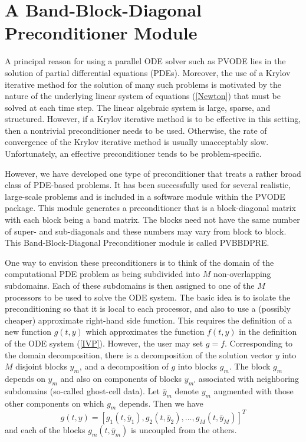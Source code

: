 \section{A Band-Block-Diagonal Preconditioner Module}

A principal reason for using a parallel ODE solver such as PVODE lies
in the solution of partial differential equations (PDEs).  Moreover,
the use of a Krylov iterative method for the solution of many such
problems is motivated by the nature of the underlying linear system of
equations (\ref{Newton}) that must be solved at each time step.  The
linear algebraic system is large, sparse, and structured. However, if
a Krylov iterative method is to be effective in this setting, then a
nontrivial preconditioner needs to be used.  Otherwise, the rate of
convergence of the Krylov iterative method is usually unacceptably
slow.  Unfortunately, an effective preconditioner tends to be
problem-specific.

However, we have developed one type of preconditioner that treats a
rather broad class of PDE-based problems.  It has been successfully
used for several realistic, large-scale problems \cite{HT} and is
included in a software module within the PVODE package. This module
generates a preconditioner that is a block-diagonal matrix with each
block being a band matrix. The blocks need not have the same number of
super- and sub-diagonals and these numbers may vary from block to
block. This Band-Block-Diagonal Preconditioner module is called
PVBBDPRE.

One way to envision these preconditioners is to think of the domain of
the computational PDE problem as being subdivided into $M$ non-overlapping
subdomains.  Each of these subdomains is then assigned to one of the
$M$ processors to be used to solve the ODE system. The basic idea is
to isolate the preconditioning so that it is local to each processor,
and also to use a (possibly cheaper) approximate right-hand side
function. This requires the definition of a new function $g(t,y)$
which approximates the function $f(t, y)$ in the definition of the ODE
system (\ref{IVP}). However, the user may set $g = f$.  Corresponding
to the domain decomposition, there is a decomposition of the solution
vector $y$ into $M$ disjoint blocks $y_m$, and a decomposition of $g$
into blocks $g_m$.  The block $g_m$ depends on $y_m$ and also on
components of blocks $y_{m'}$ associated with neighboring subdomains
(so-called ghost-cell data).  Let $\bar{y}_m$ denote $y_m$ augmented
with those other components on which $g_m$ depends.  Then we have
\begin{equation}
g(t,y) = [g_1(t,\bar{y}_1), g_2(t,\bar{y}_2), \ldots, g_M(t,\bar{y}_M)]^T
\end{equation}
and each of the blocks $g_m(t, \bar{y}_m)$ is uncoupled from the others.

